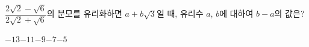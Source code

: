 $\dfrac{2\sqrt{2}-\sqrt{6}}{2\sqrt{2}+\sqrt{6}}$의 분모를 유리화하면 $a+b\sqrt{3}$일 때, 유리수 $a$, $b$에 대하여 $b-a$의 값은?
\begin{choices32}{$-13$}{$-11$}{$-9$}{$-7$}{$-5$}\end{choices32}
